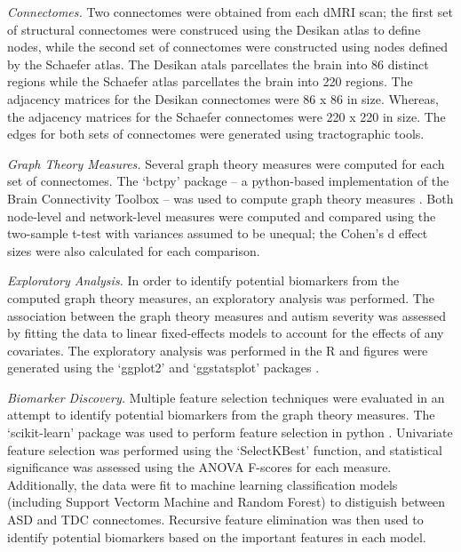 \documentclass[10pt,conference]{IEEEtran}
\begin{document}
\textit{Connectomes.} Two connectomes were obtained from each dMRI scan; the first set 
of structural connectomes were construced using the Desikan atlas to define nodes, 
while the second set of connectomes were constructed using nodes defined by the 
Schaefer atlas. The Desikan atals parcellates the brain into 86 distinct regions while 
the Schaefer atlas parcellates the brain into 220 regions. The adjacency matrices for 
the Desikan connectomes were 86 x 86 in size. Whereas, the adjacency matrices for the
Schaefer connectomes were 220 x 220 in size. The edges for both sets of connectomes
were generated using tractographic tools.

\textit{Graph Theory Measures.} Several graph theory measures were computed for each set
of connectomes. The `bctpy' package -- a python-based implementation of the Brain 
Connectivity Toolbox -- was used to compute graph theory measures \cite{Rubinov.2010.BCT}. 
Both node-level and network-level measures were computed and compared using the 
two-sample t-test with variances assumed to be unequal; the Cohen's d effect sizes were 
also calculated for each comparison. 

\textit{Exploratory Analysis.} In order to identify potential biomarkers from the computed 
graph theory measures, an exploratory analysis was performed. The association between 
the graph theory measures and autism severity was assessed by fitting the data to 
linear fixed-effects models to account for the effects of any covariates. The exploratory
analysis was performed in the R \cite{R-Core} and figures were generated using the 
`ggplot2' and `ggstatsplot' packages \cite{ggplot2, ggstatsplot}.

\textit{Biomarker Discovery.} Multiple feature selection techniques were evaluated in an 
attempt to identify potential biomarkers from the graph theory measures. The 
`scikit-learn' package was used to perform feature selection in python \cite{sklearn}. 
Univariate feature selection was performed using the `SelectKBest' function, and 
statistical significance was assessed using the ANOVA F-scores for each measure. 
Additionally, the data were fit to machine learning classification models (including
Support Vectorm Machine and Random Forest) to distiguish between ASD and TDC connectomes. 
Recursive feature elimination was then used to identify potential biomarkers based on
the important features in each model.

\end{document}
